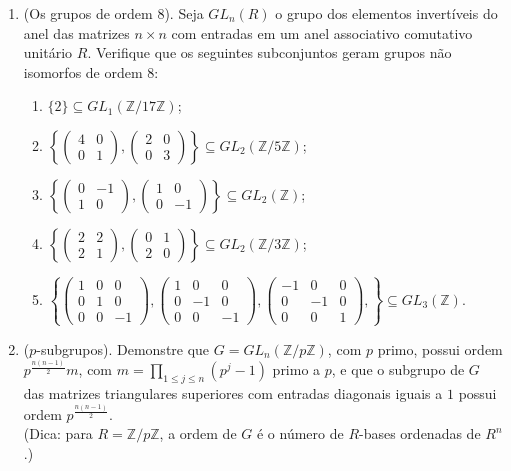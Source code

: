 \begin{enumerate}[label=12.\arabic*.]
    \item (Os grupos de ordem 8). Seja $GL_n(R)$ o grupo dos elementos invertíveis do anel das matrizes $n \times n$ com entradas em um anel associativo comutativo unitário $R$.  
    Verifique que os seguintes subconjuntos geram grupos não isomorfos de ordem 8:
    \begin{enumerate}[label=(\roman*)]
        \item $\{2\} \subseteq GL_1(\mathbb{Z}/17\mathbb{Z})$;
        \item $\left\{ \begin{pmatrix} 4 & 0 \\ 0 & 1 \end{pmatrix}, \begin{pmatrix} 2 & 0 \\ 0 & 3 \end{pmatrix} \right\} \subseteq GL_2(\mathbb{Z}/5\mathbb{Z})$;
        \item $\left\{ \begin{pmatrix} 0 & -1 \\ 1 & 0 \end{pmatrix}, \begin{pmatrix} 1 & 0 \\ 0 & -1 \end{pmatrix} \right\} \subseteq GL_2(\mathbb{Z})$;
        \item $\left\{ \begin{pmatrix} 2 & 2 \\ 2 & 1 \end{pmatrix}, \begin{pmatrix} 0 & 1 \\ 2 & 0 \end{pmatrix} \right\} \subseteq GL_2(\mathbb{Z}/3\mathbb{Z})$;
        \item $\left\{ \begin{pmatrix} 1&0&0 \\ 0&1&0 \\ 0&0&-1 \end{pmatrix}, \begin{pmatrix} 1&0&0 \\ 0&-1&0 \\ 0&0&-1 \end{pmatrix}, \begin{pmatrix} -1&0&0 \\ 0&-1&0 \\ 0&0&1 \end{pmatrix}, \right\} \subseteq GL_3(\mathbb{Z})$.
    \end{enumerate}

    \item ($p$-subgrupos). Demonstre que $G=GL_n(\mathbb{Z}/p\mathbb{Z})$, com $p$ primo, possui ordem $p^{\frac{n(n-1)}{2}}m$, 
    com $ m = \prod_{1 \leq j \leq n} (p^j - 1)$ primo a $p$, e que o subgrupo de $G$ das matrizes triangulares 
    superiores com entradas diagonais iguais a $1$ possui ordem 
    $p^{\frac{n(n-1)}{2}}$. \\
    (Dica: para $R=\mathbb{Z}/p\mathbb{Z}$, a ordem de $G$ é o número de $R$-bases ordenadas de $R^n$.)

\end{enumerate}
